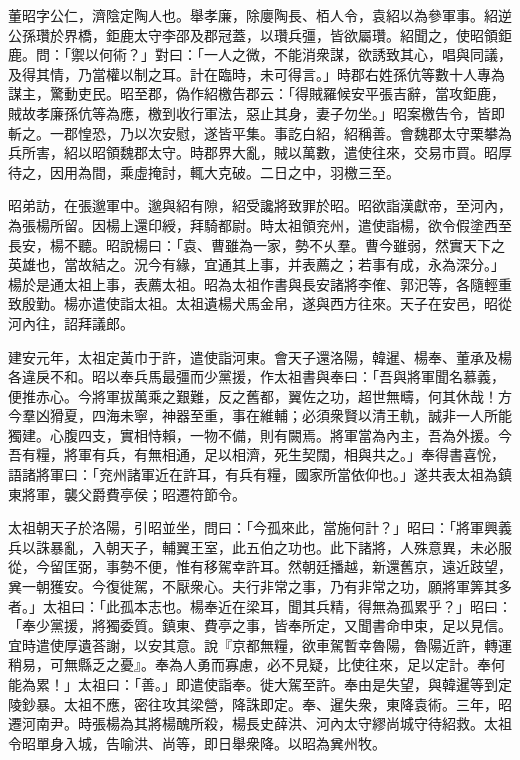 \begin{pinyinscope}
 
 
 董昭字公仁，濟陰定陶人也。舉孝廉，除廮陶長、栢人令，袁紹以為參軍事。紹逆公孫瓚於界橋，鉅鹿太守李邵及郡冠蓋，以瓚兵彊，皆欲屬瓚。紹聞之，使昭領鉅鹿。問：「禦以何術？」對曰：「一人之微，不能消衆謀，欲誘致其心，唱與同議，及得其情，乃當權以制之耳。計在臨時，未可得言。」時郡右姓孫伉等數十人專為謀主，驚動吏民。昭至郡，偽作紹檄告郡云：「得賊羅候安平張吉辭，當攻鉅鹿，賊故孝廉孫伉等為應，檄到收行軍法，惡止其身，妻子勿坐。」昭案檄告令，皆即斬之。一郡惶恐，乃以次安慰，遂皆平集。事訖白紹，紹稱善。會魏郡太守栗攀為兵所害，紹以昭領魏郡太守。時郡界大亂，賊以萬數，遣使往來，交易市買。昭厚待之，因用為間，乘虛掩討，輒大克破。二日之中，羽檄三至。
 
 
 
 
 昭弟訪，在張邈軍中。邈與紹有隙，紹受讒將致罪於昭。昭欲詣漢獻帝，至河內，為張楊所留。因楊上還印綬，拜騎都尉。時太祖領兖州，遣使詣楊，欲令假塗西至長安，楊不聽。昭說楊曰：「袁、曹雖為一家，勢不乆羣。曹今雖弱，然實天下之英雄也，當故結之。況今有緣，宜通其上事，并表薦之；若事有成，永為深分。」楊於是通太祖上事，表薦太祖。昭為太祖作書與長安諸將李傕、郭汜等，各隨輕重致殷勤。楊亦遣使詣太祖。太祖遺楊犬馬金帛，遂與西方往來。天子在安邑，昭從河內往，詔拜議郎。
 
 
 
 
 建安元年，太祖定黃巾于許，遣使詣河東。會天子還洛陽，韓暹、楊奉、董承及楊各違戾不和。昭以奉兵馬最彊而少黨援，作太祖書與奉曰：「吾與將軍聞名慕義，便推赤心。今將軍拔萬乘之艱難，反之舊都，翼佐之功，超世無疇，何其休哉！方今羣凶猾夏，四海未寧，神器至重，事在維輔；必須衆賢以清王軌，誠非一人所能獨建。心腹四支，實相恃賴，一物不備，則有闕焉。將軍當為內主，吾為外援。今吾有糧，將軍有兵，有無相通，足以相濟，死生契闊，相與共之。」奉得書喜恱，語諸將軍曰：「兖州諸軍近在許耳，有兵有糧，國家所當依仰也。」遂共表太祖為鎮東將軍，襲父爵費亭侯；昭遷符節令。
 
 
 
 
 太祖朝天子於洛陽，引昭並坐，問曰：「今孤來此，當施何計？」昭曰：「將軍興義兵以誅暴亂，入朝天子，輔翼王室，此五伯之功也。此下諸將，人殊意異，未必服從，今留匡弼，事勢不便，惟有移駕幸許耳。然朝廷播越，新還舊京，遠近跂望，兾一朝獲安。今復徙駕，不厭衆心。夫行非常之事，乃有非常之功，願將軍筭其多者。」太祖曰：「此孤本志也。楊奉近在梁耳，聞其兵精，得無為孤累乎？」昭曰：「奉少黨援，將獨委質。鎮東、費亭之事，皆奉所定，又聞書命申束，足以見信。宜時遣使厚遺荅謝，以安其意。說『京都無糧，欲車駕暫幸魯陽，魯陽近許，轉運稍易，可無縣乏之憂』。奉為人勇而寡慮，必不見疑，比使往來，足以定計。奉何能為累！」太祖曰：「善。」即遣使詣奉。徙大駕至許。奉由是失望，與韓暹等到定陵鈔暴。太祖不應，密往攻其梁營，降誅即定。奉、暹失衆，東降袁術。三年，昭遷河南尹。時張楊為其將楊醜所殺，楊長史薛洪、河內太守繆尚城守待紹救。太祖令昭單身入城，告喻洪、尚等，即日舉衆降。以昭為兾州牧。
 

\end{pinyinscope}
